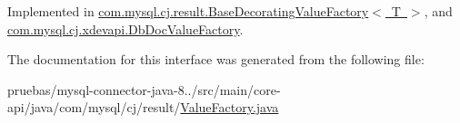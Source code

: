 Implemented in \mbox{\hyperlink{classcom_1_1mysql_1_1cj_1_1result_1_1_base_decorating_value_factory_a50680123fa3626dd2a9fbb6e4fd01f0b}{com.\+mysql.\+cj.\+result.\+Base\+Decorating\+Value\+Factory$<$ T $>$}}, and \mbox{\hyperlink{classcom_1_1mysql_1_1cj_1_1xdevapi_1_1_db_doc_value_factory_af2ac0c4c05e6606e87b045f8eaed3f1e}{com.\+mysql.\+cj.\+xdevapi.\+Db\+Doc\+Value\+Factory}}.



The documentation for this interface was generated from the following file\+:\begin{DoxyCompactItemize}
\item 
pruebas/mysql-\/connector-\/java-\/8../src/main/core-\/api/java/com/mysql/cj/result/\mbox{\hyperlink{_value_factory_8java}{Value\+Factory.\+java}}\end{DoxyCompactItemize}
